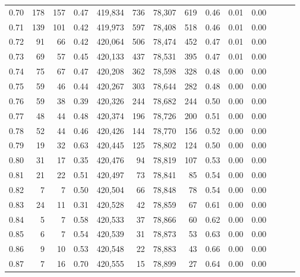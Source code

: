 \begin{tabular}{rrrrrrrrrrrrrr}
0.70 &     178 &    157 &  0.47 &  419,834 &      736 &  78,307 &     619 &  0.46 &  0.01 &      0.00 \\
0.71 &     139 &    101 &  0.42 &  419,973 &      597 &  78,408 &     518 &  0.46 &  0.01 &      0.00 \\
0.72 &      91 &     66 &  0.42 &  420,064 &      506 &  78,474 &     452 &  0.47 &  0.01 &      0.00 \\
0.73 &      69 &     57 &  0.45 &  420,133 &      437 &  78,531 &     395 &  0.47 &  0.01 &      0.00 \\
0.74 &      75 &     67 &  0.47 &  420,208 &      362 &  78,598 &     328 &  0.48 &  0.00 &      0.00 \\
0.75 &      59 &     46 &  0.44 &  420,267 &      303 &  78,644 &     282 &  0.48 &  0.00 &      0.00 \\
0.76 &      59 &     38 &  0.39 &  420,326 &      244 &  78,682 &     244 &  0.50 &  0.00 &      0.00 \\
0.77 &      48 &     44 &  0.48 &  420,374 &      196 &  78,726 &     200 &  0.51 &  0.00 &      0.00 \\
0.78 &      52 &     44 &  0.46 &  420,426 &      144 &  78,770 &     156 &  0.52 &  0.00 &      0.00 \\
0.79 &      19 &     32 &  0.63 &  420,445 &      125 &  78,802 &     124 &  0.50 &  0.00 &      0.00 \\
0.80 &      31 &     17 &  0.35 &  420,476 &       94 &  78,819 &     107 &  0.53 &  0.00 &      0.00 \\
0.81 &      21 &     22 &  0.51 &  420,497 &       73 &  78,841 &      85 &  0.54 &  0.00 &      0.00 \\
0.82 &       7 &      7 &  0.50 &  420,504 &       66 &  78,848 &      78 &  0.54 &  0.00 &      0.00 \\
0.83 &      24 &     11 &  0.31 &  420,528 &       42 &  78,859 &      67 &  0.61 &  0.00 &      0.00 \\
0.84 &       5 &      7 &  0.58 &  420,533 &       37 &  78,866 &      60 &  0.62 &  0.00 &      0.00 \\
0.85 &       6 &      7 &  0.54 &  420,539 &       31 &  78,873 &      53 &  0.63 &  0.00 &      0.00 \\
0.86 &       9 &     10 &  0.53 &  420,548 &       22 &  78,883 &      43 &  0.66 &  0.00 &      0.00 \\
0.87 &       7 &     16 &  0.70 &  420,555 &       15 &  78,899 &      27 &  0.64 &  0.00 &      0.00 \\

\end{tabular}

